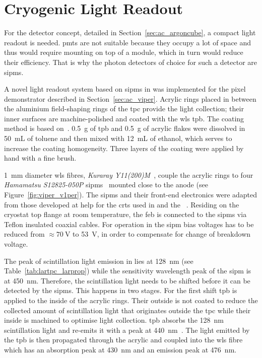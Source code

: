 \section{Cryogenic  Light Readout}
\label{sec:studies_viper-light-ro}


For the \AC{} detector concept, detailed in Section~\ref{sec:ac_argoncube}, a compact light readout is needed.
\glspl{pmt} are not suitable because they occupy a lot of space and thus would require mounting on top of a module, which in turn would reduce their efficiency.
That is why the photon detectors of choice for such a detector are \glspl{sipm}.

A novel light readout system based on \glspl{sipm} in \lar{} was implemented for the \AC{} pixel demonstrator described in Section~\ref{sec:ac_viper}.
Acrylic rings placed in between the aluminium field-shaping rings of the \gls{tpc} provide the light collection; their inner surfaces are machine-polished and coated with the \gls{wls} \gls{tpb}. 
The coating method is based on~\cite{TPBcoating}.
\SI{0.5}{\gram} of \gls{tpb} and \SI{0.5}{\gram} of acrylic flakes were dissolved in \SI{50}{\milli\liter} of toluene and then mixed with \SI{12}{\milli\liter} of ethanol, which serves to increase the coating homogeneity. 
Three layers of the coating were applied by hand with a fine brush. 

\SI{1}{\milli\metre} diameter \gls{wls} fibres, \emph{Kuraray Y11(200)M}~\cite{kuraray}, couple the acrylic rings to four \emph{Hamamatsu S12825-050P} \glspl{sipm}~\cite{crt_sipm} mounted close to the anode (see Figure~\ref{fig:viper_v1per}). 
The \glspl{sipm} and their front-end electronics were adapted from those developed at \gls{help} for the \glspl{crt} used in \uboone{} and the \sbnd{}~\cite{crt, crt_feb}.
Residing on the cryostat top flange at room temperature, the \gls{feb} is connected to the \glspl{sipm} via Teflon insulated coaxial cables.
For operation in \lar{} the \gls{sipm} bias voltages has to be reduced from $\approx \SI{70}{\volt}$ to \SI{53}{\volt}, in order to compensate for change of breakdown voltage.

The peak of scintillation light emission in \lar{} lies at \SI{128}{\nano\metre} (see Table~\ref{tab:lartpc_larprop}) while the sensitivity wavelength peak of the \gls{sipm} is at \SI{450}{\nano\metre}.
Therefore, the scintillation light needs to be shifted before it can be detected by the \glspl{sipm}.
This happens in two stages.
For the first shift \gls{tpb} is applied to the inside of the acrylic rings.
Their outside is not coated to reduce the collected amount of scintillation light that originates outside the \gls{tpc} while their inside is machined to optimise light collection.
\gls{tpb} absorbs the \SI{128}{\nano\metre} scintillation light and re-emits it with a peak at \SI{440}{\nano\metre}~\cite{tpb}.
The light emitted by the \gls{tpb} is then propagated through the acrylic and coupled into the \gls{wls} fibre which has an absorption peak at \SI{430}{\nano\metre} and an emission peak at \SI{476}{\nano\metre}.

